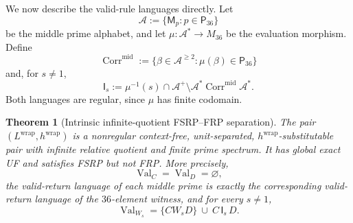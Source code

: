 \documentclass[11pt,a4paper]{article}
\newtheorem{theorem}{Theorem}[section]
\newcommand{\Val}{\operatorname{Val}}
\newcommand{\Corr}{\operatorname{Corr}}
\begin{document}
We now describe the valid-rule languages directly.  Let
\[
  \mathcal A:=\{\mathsf M_p:p\in\mathsf P_{36}\}
\]
be the middle prime alphabet, and let
$\mu:\mathcal A^*\to M_{36}$ be the evaluation morphism.  Define
\[
  \Corr^{\mathrm{mid}}
  :=\{\beta\in\mathcal A^{\ge2}:\mu(\beta)\in\mathsf P_{36}\}
\]
and, for $s\ne1$,
\[
  \mathsf I_s
  :=\mu^{-1}(s)\cap\mathcal A^+
     \setminus
     \mathcal A^*\Corr^{\mathrm{mid}}\mathcal A^*.
\]
Both languages are regular, since $\mu$ has finite codomain.

\begin{theorem}[Intrinsic infinite-quotient FSRP--FRP separation]
\label{thm:wrapped-fsrp}
The pair $(L^{\mathrm{wrap}},h^{\mathrm{wrap}})$ is a nonregular
context-free, unit-separated, $h^{\mathrm{wrap}}$-substitutable pair with
infinite relative quotient and finite prime spectrum.  It has global exact UF
and satisfies FSRP but not FRP.  More precisely,
\[
  \Val_C=\Val_D=\varnothing,
\]
the valid-return language of each middle prime is exactly the corresponding
valid-return language of the $36$-element witness, and for every $s\ne1$,
\[
  \boxed{
  \Val_{W_s}=\{CW_sD\}\ \cup\ C\,\mathsf I_s\,D.
  }
\]
\end{theorem}
\end{document}

